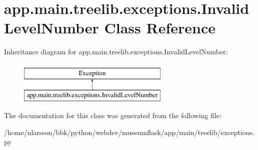 \hypertarget{classapp_1_1main_1_1treelib_1_1exceptions_1_1InvalidLevelNumber}{}\section{app.\+main.\+treelib.\+exceptions.\+Invalid\+Level\+Number Class Reference}
\label{classapp_1_1main_1_1treelib_1_1exceptions_1_1InvalidLevelNumber}
Inheritance diagram for app.\+main.\+treelib.\+exceptions.\+Invalid\+Level\+Number\+:\begin{figure}[H]
\begin{center}
\leavevmode
\includegraphics[height=2.000000cm]{classapp_1_1main_1_1treelib_1_1exceptions_1_1InvalidLevelNumber}
\end{center}
\end{figure}


The documentation for this class was generated from the following file\+:\begin{DoxyCompactItemize}
\item 
/home/nlarsson/bbk/python/webdev/museumflask/app/main/treelib/exceptions.\+py\end{DoxyCompactItemize}
